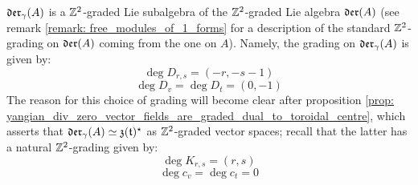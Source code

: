         \begin{corollary} \label{coro: yangian_div_zero_vector_fields_are_graded}
            $\mathfrak{der}_{\gamma}(A)$ is a $\mathbb{Z}^2$-graded Lie subalgebra of the $\mathbb{Z}^2$-graded Lie algebra $\mathfrak{der}(A)$ (see remark \ref{remark: free_modules_of_1_forms} for a description of the standard $\mathbb{Z}^2$-grading on $\mathfrak{der}(A)$ coming from the one on $A$). Namely, the grading on $\mathfrak{der}_{\gamma}(A)$ is given by:
                $$\deg D_{r, s} = (-r, -s - 1)$$
                $$\deg D_v = \deg D_t = (0, -1)$$
            The reason for this choice of grading will become clear after proposition \ref{prop: yangian_div_zero_vector_fields_are_graded_dual_to_toroidal_centre}, which asserts that $\mathfrak{der}_{\gamma}(A) \simeq \mathfrak{z}(\mathfrak{t})^{\star}$ as $\mathbb{Z}^2$-graded vector spaces; recall that the latter has a natural $\mathbb{Z}^2$-grading given by:
                $$\deg K_{r, s} = (r, s)$$
                $$\deg c_v = \deg c_t = 0$$
        \end{corollary}

